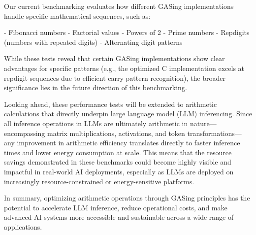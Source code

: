 Our current benchmarking evaluates how different GASing implementations handle specific mathematical sequences, such as:

- Fibonacci numbers
- Factorial values
- Powers of 2
- Prime numbers
- Repdigits (numbers with repeated digits)
- Alternating digit patterns

While these tests reveal that certain GASing implementations show clear advantages for specific patterns (e.g., the optimized C implementation excels at repdigit sequences due to efficient carry pattern recognition), the broader significance lies in the future direction of this benchmarking.

Looking ahead, these performance tests will be extended to arithmetic calculations that directly underpin large language model (LLM) inferencing. Since all inference operations in LLMs are ultimately arithmetic in nature—encompassing matrix multiplications, activations, and token transformations—any improvement in arithmetic efficiency translates directly to faster inference times and lower energy consumption at scale. This means that the resource savings demonstrated in these benchmarks could become highly visible and impactful in real-world AI deployments, especially as LLMs are deployed on increasingly resource-constrained or energy-sensitive platforms.

In summary, optimizing arithmetic operations through GASing principles has the potential to accelerate LLM inference, reduce operational costs, and make advanced AI systems more accessible and sustainable across a wide range of applications.
